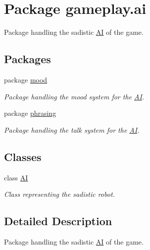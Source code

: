 \hypertarget{namespacegameplay_1_1ai}{\section{Package gameplay.\-ai}
\label{namespacegameplay_1_1ai}
}


Package handling the sadistic \hyperlink{classgameplay_1_1ai_1_1_a_i}{A\-I} of the game.  


\subsection*{Packages}
\begin{DoxyCompactItemize}
\item 
package \hyperlink{namespacegameplay_1_1ai_1_1mood}{mood}
\begin{DoxyCompactList}\small\item\em Package handling the mood system for the \hyperlink{classgameplay_1_1ai_1_1_a_i}{A\-I}. \end{DoxyCompactList}\item 
package \hyperlink{namespacegameplay_1_1ai_1_1phrasing}{phrasing}
\begin{DoxyCompactList}\small\item\em Package handling the talk system for the \hyperlink{classgameplay_1_1ai_1_1_a_i}{A\-I}. \end{DoxyCompactList}\end{DoxyCompactItemize}
\subsection*{Classes}
\begin{DoxyCompactItemize}
\item 
class \hyperlink{classgameplay_1_1ai_1_1_a_i}{A\-I}
\begin{DoxyCompactList}\small\item\em Class representing the sadistic robot. \end{DoxyCompactList}\end{DoxyCompactItemize}


\subsection{Detailed Description}
Package handling the sadistic \hyperlink{classgameplay_1_1ai_1_1_a_i}{A\-I} of the game. 
